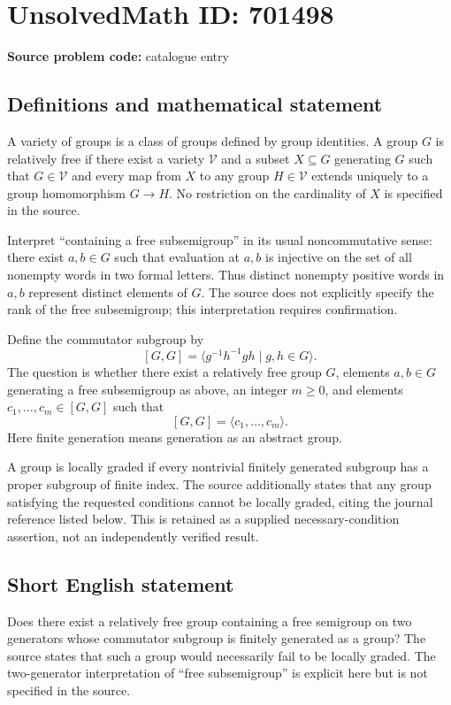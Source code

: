 \documentclass[11pt]{article}
\begin{document}
\section*{UnsolvedMath ID: 701498}
\textbf{Source problem code:} catalogue entry
\subsection{Definitions and mathematical statement}
A variety of groups is a class of groups defined by group identities. A group \(G\) is relatively free if there exist a variety \(\mathcal V\) and a subset \(X\subseteq G\) generating \(G\) such that \(G\in\mathcal V\) and every map from \(X\) to any group \(H\in\mathcal V\) extends uniquely to a group homomorphism \(G\to H\). No restriction on the cardinality of \(X\) is specified in the source.

Interpret ``containing a free subsemigroup'' in its usual noncommutative sense: there exist \(a,b\in G\) such that evaluation at \(a,b\) is injective on the set of all nonempty words in two formal letters. Thus distinct nonempty positive words in \(a,b\) represent distinct elements of \(G\). The source does not explicitly specify the rank of the free subsemigroup; this interpretation requires confirmation.

Define the commutator subgroup by
\[
[G,G]=\langle g^{-1}h^{-1}gh\mid g,h\in G\rangle.
\]
The question is whether there exist a relatively free group \(G\), elements \(a,b\in G\) generating a free subsemigroup as above, an integer \(m\geq 0\), and elements \(c_1,\ldots,c_m\in[G,G]\) such that
\[
[G,G]=\langle c_1,\ldots,c_m\rangle.
\]
Here finite generation means generation as an abstract group.

A group is locally graded if every nontrivial finitely generated subgroup has a proper subgroup of finite index. The source additionally states that any group satisfying the requested conditions cannot be locally graded, citing the journal reference listed below. This is retained as a supplied necessary-condition assertion, not an independently verified result.
\subsection{Short English statement}
Does there exist a relatively free group containing a free semigroup on two generators whose commutator subgroup is finitely generated as a group? The source states that such a group would necessarily fail to be locally graded. The two-generator interpretation of ``free subsemigroup'' is explicit here but is not specified in the source.
\end{document}
